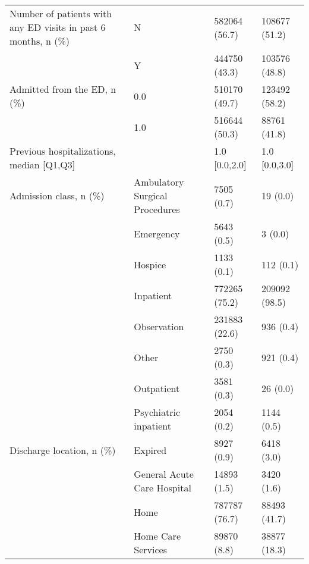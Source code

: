 \begin{tabular}{llll}
Number of patients with any ED visits in past 6 months, n (\%) & N &                         582064 (56.7) &      108677 (51.2) \\
                                       & Y &                         444750 (43.3) &      103576 (48.8) \\
Admitted from the ED, n (\%) & 0.0 &                         510170 (49.7) &      123492 (58.2) \\
                                       & 1.0 &                         516644 (50.3) &       88761 (41.8) \\
Previous hospitalizations, median [Q1,Q3] &   &                         1.0 [0.0,2.0] &      1.0 [0.0,3.0] \\
Admission class, n (\%) & Ambulatory Surgical Procedures &                            7505 (0.7) &           19 (0.0) \\
                                       & Emergency &                            5643 (0.5) &            3 (0.0) \\
                                       & Hospice &                            1133 (0.1) &          112 (0.1) \\
                                       & Inpatient &                         772265 (75.2) &      209092 (98.5) \\
                                       & Observation &                         231883 (22.6) &          936 (0.4) \\
                                       & Other &                            2750 (0.3) &          921 (0.4) \\
                                       & Outpatient &                            3581 (0.3) &           26 (0.0) \\
                                       & Psychiatric inpatient &                            2054 (0.2) &         1144 (0.5) \\
Discharge location, n (\%) & Expired &                            8927 (0.9) &         6418 (3.0) \\
                                       & General Acute Care Hospital &                           14893 (1.5) &         3420 (1.6) \\
                                       & Home &                         787787 (76.7) &       88493 (41.7) \\
                                       & Home Care Services &                           89870 (8.8) &       38877 (18.3) \\

\end{tabular}
